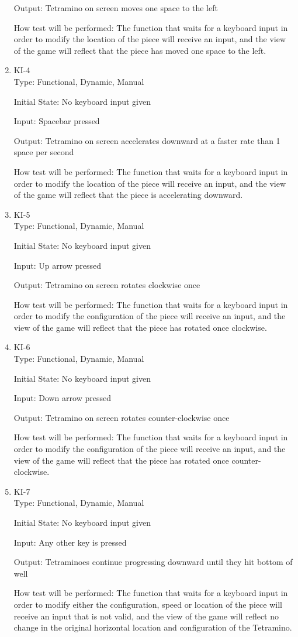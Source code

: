 \documentclass[12pt, titlepage]{article}
\begin{document}
\begin{enumerate}
Output: Tetramino on screen moves one space to the left
					
How test will be performed: The function that waits for a keyboard input in order to modify the location of the piece will receive an input, and the view of the game will reflect that the piece has moved one space to the left.

\item{KI-4\\}
Type: Functional, Dynamic, Manual
					
Initial State: No keyboard input given
					
Input: Spacebar pressed
					
Output: Tetramino on screen accelerates downward at a faster rate than 1 space per second
					
How test will be performed: The function that waits for a keyboard input in order to modify the location of the piece will receive an input, and the view of the game will reflect that the piece is accelerating downward.

\item{KI-5\\}
Type: Functional, Dynamic, Manual
					
Initial State: No keyboard input given
					
Input: Up arrow pressed
					
Output: Tetramino on screen rotates clockwise once
					
How test will be performed: The function that waits for a keyboard input in order to modify the configuration of the piece will receive an input, and the view of the game will reflect that the piece has rotated once clockwise.

\item{KI-6\\}
Type: Functional, Dynamic, Manual
					
Initial State: No keyboard input given
					
Input: Down arrow pressed
					
Output: Tetramino on screen rotates counter-clockwise once
					
How test will be performed: The function that waits for a keyboard input in order to modify the configuration of the piece will receive an input, and the view of the game will reflect that the piece has rotated once counter-clockwise.

\item{KI-7\\}
Type: Functional, Dynamic, Manual
					
Initial State: No keyboard input given
					
Input: Any other key is pressed
					
Output: Tetraminoes continue progressing downward until they hit bottom of well
					
How test will be performed: The function that waits for a keyboard input in order to modify either the configuration, speed or location of the piece will receive an input that is not valid, and the view of the game will reflect no change in the original horizontal location and configuration of the Tetramino.
\end{enumerate}
\end{document}

